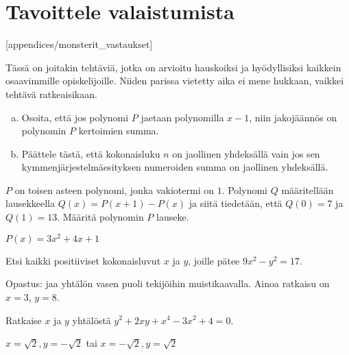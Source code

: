 \section{Tavoittele valaistumista}

[appendices/monsterit_vastaukset]

Tässä on joitakin tehtäviä, jotka on arvioitu hauskoiksi ja hyödyllisiksi kaikkein osaavimmille opiskelijoille. Niiden parissa vietetty aika ei mene hukkaan, vaikkei tehtävä ratkeaisikaan.

\begin{tehtava}
    \begin{enumerate}[a)]
        \item Osoita, että jos polynomi $P$ jaetaan polynomilla $x-1$, niin jakojäännös on polynomin $P$ kertoimien summa.
        \item Päättele tästä, että kokonaisluku $n$ on jaollinen yhdeksällä vain jos sen kymmenjärjestelmäesityksen numeroiden summa on jaollinen yhdeksällä.
    \end{enumerate}
\end{tehtava}

\begin{tehtava} %
    $P$ on toisen asteen polynomi, jonka vakiotermi on $1$. Polynomi $Q$ määritellään lausekkeella $Q(x)=P(x+1)-P(x)$ ja siitä tiedetään, että $Q(0)=7$ ja $Q(1)=13$. Määritä polynomin $P$ lauseke.
    \begin{vastaus}
        $P(x) = 3x^2+4x+1$
    \end{vastaus}
\end{tehtava}

\begin{tehtava} %
    Etsi kaikki positiiviset kokonaisluvut $x$ ja $y$, joille pätee $9x^2-y^2=17$.
    \begin{vastaus}
    Opastus: jaa yhtälön vasen puoli tekijöihin muistikaavalla. 
    Ainoa ratkaisu on $x = 3$, $y=8$.
    \end{vastaus}
\end{tehtava}

\begin{tehtava} %
    Ratkaise $x$ ja $y$ yhtälöstä $y^2+2xy+x^4-3x^2+4=0$.
    \begin{vastaus}
        $x=\sqrt{2}, y=-\sqrt{2}$ tai $x=-\sqrt{2}, y=\sqrt{2}$
    \end{vastaus}
\end{tehtava}

